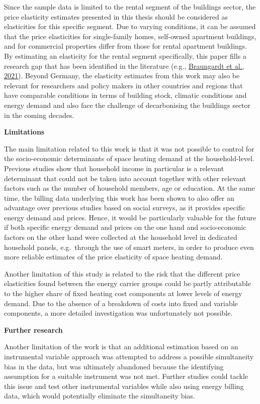 \documentclass[12pt,twoside]{reedthesis}
\begin{document}
Since the sample data is limited to the rental segment of the buildings sector, the price elasticity estimates presented in this thesis should be considered as elasticities for this specific segment. Due to varying conditions, it can be assumed that the price elasticities for single-family homes, self-owned apartment buildings, and for commercial properties differ from those for rental apartment buildings. By estimating an elasticity for the rental segment specifically, this paper fills a research gap that has been identified in the literature (e.g., \protect\hyperlink{ref-braungardt_etal21}{Braungardt et al., 2021}). Beyond Germany, the elasticity estimates from this work may also be relevant for researchers and policy makers in other countries and regions that have comparable conditions in terms of building stock, climatic conditions and energy demand and also face the challenge of decarbonising the buildings sector in the coming decades.

\textbf{Limitations}

The main limitation related to this work is that it was not possible to control for the socio-economic determinants of space heating demand at the household-level. Previous studies show that household income in particular is a relevant determinant that could not be taken into account together with other relevant factors such as the number of household members, age or education. At the same time, the billing data underlying this work has been shown to also offer an advantage over previous studies based on social surveys, as it provides specific energy demand and prices. Hence, it would be particularly valuable for the future if both specific energy demand and prices on the one hand and socio-economic factors on the other hand were collected at the household level in dedicated household panels, e.g.~through the use of smart meters, in order to produce even more reliable estimates of the price elasticity of space heating demand.

Another limitation of this study is related to the risk that the different price elasticities found between the energy carrier groups could be partly attributable to the higher share of fixed heating cost components at lower levels of energy demand. Due to the absence of a breakdown of costs into fixed and variable components, a more detailed investigation was unfortunately not possible.

\textbf{Further research}

Another limitation of the work is that an additional estimation based on an instrumental variable approach was attempted to address a possible simultaneity bias in the data, but was ultimately abandoned because the identifying assumption for a suitable instrument was not met. Further studies could tackle this issue and test other instrumental variables while also using energy billing data, which would potentially eliminate the simultaneity bias.
\end{document}
